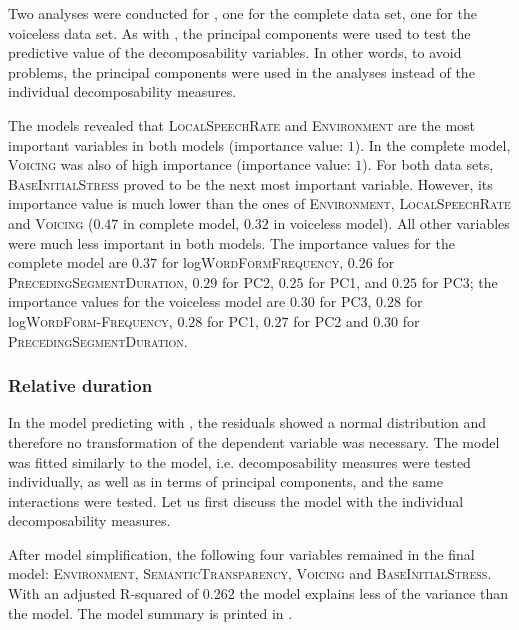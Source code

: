 Two  analyses were conducted for , one for the complete data set, one for the voiceless data set. As with , the principal components were used to test the predictive value of the decomposability variables. In other words, to avoid  problems, the principal components were used in the analyses instead of the individual decomposability measures. 

The models revealed that \textsc{LocalSpeechRate} and \textsc{Environment}  are the most important variables in both models (importance value: $1$). In the complete model, \textsc{Voicing} was also of high importance (importance value: $1$). 
For both data sets, \textsc{BaseInitialStress} proved to be the next most important variable. However, its importance value is much lower than the ones of \textsc{Environment}, \textsc{LocalSpeechRate} and \textsc{Voicing} ($0.47$ in complete model, $0.32$ in voiceless model).
 All other variables were much less important in both models. 
The importance values for the complete model are $0.37$ for log\textsc{WordFormFrequency},  $0.26$ for \textsc{PrecedingSegmentDuration}, $0.29$ for \textsc{PC2}, $0.25$ for \textsc{PC1},  and $0.25$ for \textsc{PC3}; 
 the importance values for the voiceless model are $0.30$ for \textsc{PC3}, $0.28$ for log\textsc{WordForm-Frequency}, $0.28$ for \textsc{PC1}, $0.27$ for \textsc{PC2} and $0.30$ for \textsc{PrecedingSegmentDuration}.



\subsubsection{Relative duration}

In the model predicting  with , the residuals showed a normal distribution and therefore no transformation of the dependent variable was necessary. The model was fitted similarly to the  model, i.e. decomposability measures were tested individually, as well as in terms of principal components, and the same interactions were tested. Let us first discuss the model with the individual decomposability measures.

After model simplification, the following four variables remained in the final model: \textsc{Environment}, \textsc{SemanticTransparency}, \textsc{Voicing} and \textsc{BaseInitialStress}. With an adjusted R-squared of $0.262$ the model explains less of the variance than the  model. The model summary is printed in .
  
